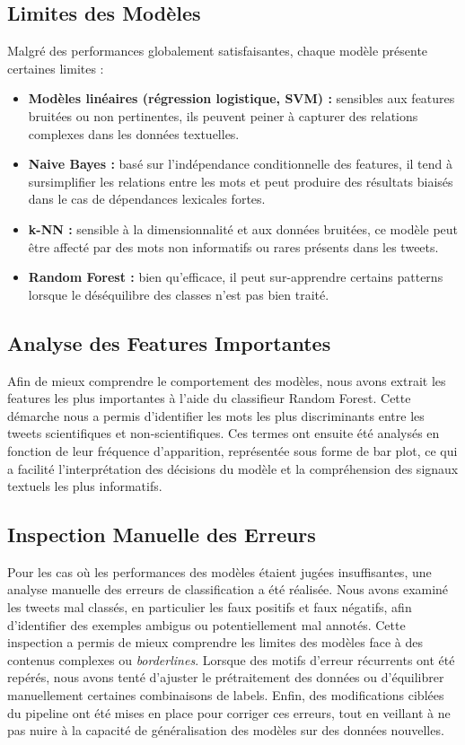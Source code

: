 \subsection{Limites des Modèles}\label{subsec:limites-des-modeles}
Malgré des performances globalement satisfaisantes, chaque modèle présente certaines limites :
\begin{itemize}
  \item \textbf{Modèles linéaires (régression logistique, SVM) :} sensibles aux features bruitées ou non pertinentes, ils peuvent peiner à capturer des relations complexes dans les données textuelles.
  \item \textbf{Naive Bayes :} basé sur l’indépendance conditionnelle des features, il tend à sursimplifier les relations entre les mots et peut produire des résultats biaisés dans le cas de dépendances lexicales fortes.
  \item \textbf{k-NN :} sensible à la dimensionnalité et aux données bruitées, ce modèle peut être affecté par des mots non informatifs ou rares présents dans les tweets.
  \item \textbf{Random Forest :} bien qu’efficace, il peut sur-apprendre certains patterns lorsque le déséquilibre des classes n’est pas bien traité.
\end{itemize}

\subsection{Analyse des Features Importantes}\label{subsec:analyse-des-features-importantes}
Afin de mieux comprendre le comportement des modèles, nous avons extrait les features les plus importantes à l’aide du classifieur Random Forest.
Cette démarche nous a permis d’identifier les mots les plus discriminants entre les tweets scientifiques et non-scientifiques.
Ces termes ont ensuite été analysés en fonction de leur fréquence d’apparition, représentée sous forme de bar plot, ce qui a facilité l’interprétation des décisions du modèle et la compréhension des signaux textuels les plus informatifs.

\subsection{Inspection Manuelle des Erreurs}\label{subsec:inspection-manuelle-des-erreurs}
Pour les cas où les performances des modèles étaient jugées insuffisantes, une analyse manuelle des erreurs de classification a été réalisée.
Nous avons examiné les tweets mal classés, en particulier les faux positifs et faux négatifs, afin d’identifier des exemples ambigus ou potentiellement mal annotés.
Cette inspection a permis de mieux comprendre les limites des modèles face à des contenus complexes ou \textit{borderlines}.
Lorsque des motifs d’erreur récurrents ont été repérés, nous avons tenté d’ajuster le prétraitement des données ou d’équilibrer manuellement certaines combinaisons de labels.
Enfin, des modifications ciblées du pipeline ont été mises en place pour corriger ces erreurs, tout en veillant à ne pas nuire à la capacité de généralisation des modèles sur des données nouvelles.
